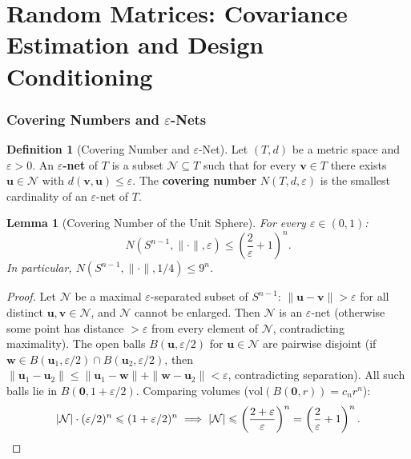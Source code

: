 \documentclass[14pt]{extarticle}
\theoremstyle{plain}
\newtheorem{lemma}[theorem]{Lemma}
\theoremstyle{definition}
\newtheorem{definition}{Definition}[section]
\theoremstyle{remark}
\newcommand{\bzero}{\mathbf{0}}
\newcommand{\bw}{\mathbf{w}}
\newcommand{\bv}{\mathbf{v}}
\newcommand{\bu}{\mathbf{u}}
\newcommand{\calN}{\mathcal{N}}
\begin{document}
\newpage
\part{Random Matrices: Covariance Estimation and Design Conditioning}\label{part:random-matrices}

\section{Covering Numbers and $\varepsilon$-Nets}\label{sec:covering}

\begin{definition}[Covering Number and $\varepsilon$-Net]\label{def:covering}
Let $(T, d)$ be a metric space and $\varepsilon > 0$. An \textbf{$\varepsilon$-net} of $T$ is a subset $\calN \subseteq T$ such that for every $\bv \in T$ there exists $\bu \in \calN$ with $d(\bv, \bu) \leqslant \varepsilon$. The \textbf{covering number} $N(T, d, \varepsilon)$ is the smallest cardinality of an $\varepsilon$-net of $T$.
\end{definition}

\begin{lemma}[Covering Number of the Unit Sphere]\label{lem:covering-sphere}
For every $\varepsilon \in (0, 1)$:
\begin{equation}\label{eq:covering-sphere}
N(S^{n-1}, \|\cdot\|, \varepsilon) \leqslant \left(\frac{2}{\varepsilon} + 1\right)^n.
\end{equation}
In particular, $N(S^{n-1}, \|\cdot\|, 1/4) \leqslant 9^n$.
\end{lemma}

\begin{proof}
Let $\calN$ be a maximal $\varepsilon$-separated subset of $S^{n-1}$: $\|\bu - \bv\| > \varepsilon$ for all distinct $\bu, \bv \in \calN$, and $\calN$ cannot be enlarged. Then $\calN$ is an $\varepsilon$-net (otherwise some point has distance $> \varepsilon$ from every element of $\calN$, contradicting maximality). The open balls $B(\bu, \varepsilon/2)$ for $\bu \in \calN$ are pairwise disjoint (if $\bw \in B(\bu_1, \varepsilon/2) \cap B(\bu_2, \varepsilon/2)$, then $\|\bu_1 - \bu_2\| \leqslant \|\bu_1 - \bw\| + \|\bw - \bu_2\| < \varepsilon$, contradicting separation). All such balls lie in $B(\bzero, 1 + \varepsilon/2)$. Comparing volumes ($\mathrm{vol}(B(\bzero, r)) = c_n r^n$):
\[
|\calN| \cdot (\varepsilon/2)^n \leqslant (1 + \varepsilon/2)^n \implies |\calN| \leqslant \left(\frac{2 + \varepsilon}{\varepsilon}\right)^n = \left(\frac{2}{\varepsilon} + 1\right)^n. \qedhere
\]
\end{proof}
\end{document}
